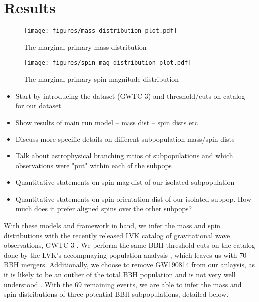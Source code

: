 \section{Results} \label{sec:results}

\begin{figure*}[ht!]
    \begin{centering}
        \texttt{[image: figures/mass\_distribution\_plot.pdf]}
        \caption{The marginal primary mass distribution}
        \label{fig:mass_distribution}
    \end{centering}
\end{figure*}

\begin{figure}[ht!]
    \begin{centering}
        \texttt{[image: figures/spin\_mag\_distribution\_plot.pdf]}
        \caption{The marginal primary spin magnitude distribution}
        \label{fig:spin_mag_distribution}
    \end{centering}
\end{figure}

\begin{itemize}
    \item Start by introducing the dataset (GWTC-3) and threshold/cuts on catalog for our dataset
    \item Show results of main run model -- mass dist -- spin dists etc
    \item Discuss more specific details on different subpopulation mass/spin dists
    \item Talk about astrophysical branching ratios of subpopulations and which observations were "put" within each of the subpops
    \item Quantitative statements on spin mag dist of our isolated subpopulation
    \item Quantitative statements on spin orientation dist of our isolated subpop. How much does it prefer aligned spins over the other subpops?
\end{itemize}

With these models and framework in hand, we infer the mass and spin distributions with the recently released LVK catalog of gravitational wave observations, GWTC-3 . We perform the same BBH threshold cuts on the catalog done by the LVK's accompnaying population analysis , which leaves us with 70 BBH mergers. Additionally, we choose to remove GW190814 from our anlaysis, as it is likely to be an outlier of the total BBH population and is not very well understood . With the 69 remaining events, we are able to infer the mass and spin distributions of three potential BBH subpopulations, detailed below.

